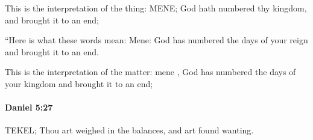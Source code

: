 			\begin{versebox}
					\item[BHS] 
					\item[LXX] 
					\item[ASV] This is the interpretation of the thing: MENE; God hath numbered thy kingdom, and brought it to an end;
					\item[NIV] “Here is what these words mean: Mene: God has numbered the days of your reign and brought it to an end.
					\item[NRSV] This is the interpretation of the matter: mene , God has numbered the days of your kingdom and brought it to an end;
			\end{versebox}

		\paragraph{Daniel 5:27} %
			\label{DANIEL-5-27}

			TEKEL; Thou art weighed in the balances, and art found wanting.

